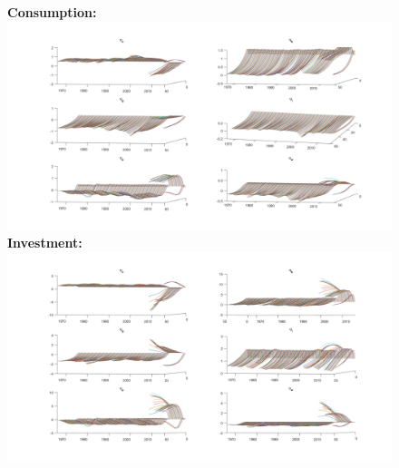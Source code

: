 \documentclass[12pt,reqno]{article}
\numberwithin{equation}{section}
\begin{document}
\begin{figure}[H]
\textbf{Consumption:}\\
\includegraphics[scale=0.5]{AR1_impresp_cons_3d.pdf}
\textbf{Investment:}\\
\includegraphics[scale=0.5]{AR1_impresp_inv_3d.pdf}

\end{figure}
\end{document}
